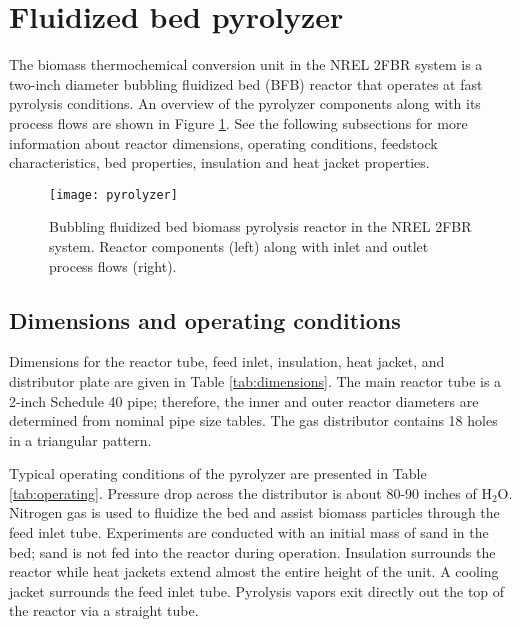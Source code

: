 
\section{Fluidized bed pyrolyzer}

The biomass thermochemical conversion unit in the NREL 2FBR system is a two-inch diameter bubbling fluidized bed (BFB) reactor that operates at fast pyrolysis conditions. An overview of the pyrolyzer components along with its process flows are shown in Figure \ref{fig:pyrolyzer}. See the following subsections for more information about reactor dimensions, operating conditions, feedstock characteristics, bed properties, insulation and heat jacket properties.

\begin{figure}[H]
    \centering
    \texttt{[image: pyrolyzer]}
    \caption{Bubbling fluidized bed biomass pyrolysis reactor in the NREL 2FBR system. Reactor components (left) along with inlet and outlet process flows (right).}
    \label{fig:pyrolyzer}
\end{figure}

\subsection{Dimensions and operating conditions}

Dimensions for the reactor tube, feed inlet, insulation, heat jacket, and distributor plate are given in Table \ref{tab:dimensions}. The main reactor tube is a 2-inch Schedule 40 pipe; therefore, the inner and outer reactor diameters are determined from nominal pipe size tables. The gas distributor contains 18 holes in a triangular pattern.

Typical operating conditions of the pyrolyzer are presented in Table \ref{tab:operating}. Pressure drop across the distributor is about 80-90 inches of H$_2$O. Nitrogen gas is used to fluidize the bed and assist biomass particles through the feed inlet tube. Experiments are conducted with an initial mass of sand in the bed; sand is not fed into the reactor during operation. Insulation surrounds the reactor while heat jackets extend almost the entire height of the unit. A cooling jacket surrounds the feed inlet tube. Pyrolysis vapors exit directly out the top of the reactor via a straight tube.

